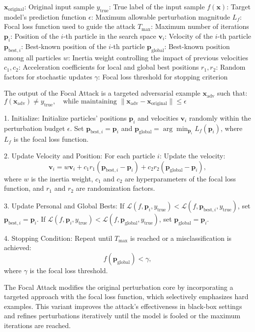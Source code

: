$\mathbf{x}_{\text{original}}$: Original input sample  
$y_{\text{true}}$: True label of the input sample  
$f(\mathbf{x})$: Target model's prediction function  
$\epsilon$: Maximum allowable perturbation magnitude  
$L_f$: Focal loss function used to guide the attack  
$T_{\text{max}}$: Maximum number of iterations  
$\mathbf{p}_i$: Position of the $i$-th particle in the search space  
$\mathbf{v}_i$: Velocity of the $i$-th particle  
$\mathbf{p}_{\text{best}, i}$: Best-known position of the $i$-th particle  
$\mathbf{p}_{\text{global}}$: Best-known position among all particles  
$w$: Inertia weight controlling the impact of previous velocities  
$c_1, c_2$: Acceleration coefficients for local and global best positions  
$r_1, r_2$: Random factors for stochastic updates  
$\gamma$: Focal loss threshold for stopping criterion  


The output of the Focal Attack is a targeted adversarial example $\mathbf{x}_{\text{adv}}$ such that:
$f(\mathbf{x}_{\text{adv}}) \neq y_{\text{true}}, \quad \text{while maintaining $\|\mathbf{x}_{\text{adv}} - \mathbf{x}_{\text{original}}\| \leq \epsilon$}$

1. Initialize: 
   Initialize particles' positions $\mathbf{p}_i$ and velocities $\mathbf{v}_i$ randomly within the perturbation budget $\epsilon$.  
   Set $\mathbf{p}_{\text{best}, i} = \mathbf{p}_i$ and $\mathbf{p}_{\text{global}} = \arg\min_{\mathbf{p}_i} L_f(\mathbf{p}_i)$, where $L_f$ is the focal loss function.

2. Update Velocity and Position: For each particle $i$:  
   Update the velocity:  
   \[
   \mathbf{v}_i = w \mathbf{v}_i + c_1 r_1 (\mathbf{p}_{\text{best}, i} - \mathbf{p}_i) + c_2 r_2 (\mathbf{p}_{\text{global}} - \mathbf{p}_i),
   \]  
   where $w$ is the inertia weight, $c_1$ and $c_2$ are hyperparameters of the focal loss function, and $r_1$ and $r_2$ are randomization factors.

3. Update Personal and Global Bests:  
   If $\mathcal{L}(f, \mathbf{p}_i, y_{\text{true}}) < \mathcal{L}(f, \mathbf{p}_{\text{best}, i}, y_{\text{true}})$, set $\mathbf{p}_{\text{best}, i} = \mathbf{p}_i$.  
   If $\mathcal{L}(f, \mathbf{p}_i, y_{\text{true}}) < \mathcal{L}(f, \mathbf{p}_{\text{global}}, y_{\text{true}})$, set $\mathbf{p}_{\text{global}} = \mathbf{p}_i$.  

4. Stopping Condition:  
   Repeat until $T_{\text{max}}$ is reached or a misclassification is achieved:  
   \[
   f(\mathbf{p}_{\text{global}}) < \gamma,
   \] 
   where $\gamma$ is the focal loss threshold.

The Focal Attack modifies the original perturbation core by incorporating a targeted approach with the focal loss function, which selectively emphasizes hard examples. This variant improves the attack's effectiveness in black-box settings and refines perturbations iteratively until the model is fooled or the maximum iterations are reached.